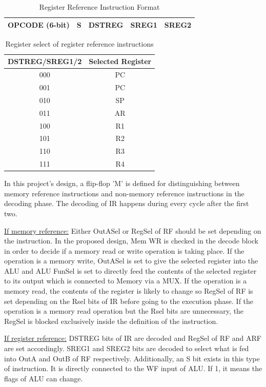 \documentclass[pdftex,12pt,a4paper]{article}
\begin{document}
\begin{table}[H]
\centering
\begin{tabular}{|c|c|c|c|c|}
  \hline
  OPCODE (6-bit) & S & DSTREG & SREG1 & SREG2\\
  \hline
\end{tabular}
\caption{Register Reference Instruction Format\cite{ref1}}
\end{table}

\begin{table}[H]
\centering
\begin{tabular}{|c|c|}
  \hline
  DSTREG/SREG1/2 & Selected Register\\
  \hline
  000 & PC\\
  \hline
  001 & PC\\
  \hline
  010 & SP\\
  \hline
  011 & AR\\
  \hline
  100 & R1\\
  \hline
  101 & R2\\
  \hline
  110 & R3\\
  \hline
  111 & R4\\
  \hline
\end{tabular}
\caption{Register select of register reference instructions\cite{ref1}}
\end{table}

In this project's design, a flip-flop 'M' is defined for distinguishing
between memory reference instructions and non-memory reference
instructions in the decoding phase. The decoding of IR happens during
every cycle after the first two.

\underline{If memory reference:}
Either OutASel or RegSel of RF should be set depending on the
instruction. In the proposed design, Mem WR is checked in the decode
block in order to decide if a memory read or write operation is
taking place. If the operation is a memory write, OutASel is set to
give the selected register into the ALU and ALU FunSel is set to
directly feed the contents of the selected register to its output
which is connected to Memory via a MUX. If the operation is a memory
read, the contents of the register is likely to change so RegSel of RF
is set depending on the Rsel bits of IR before going to the execution
phase. If the operation is a memory read operation but the Rsel bits
are unnecessary, the RegSel is blocked exclusively inside the
definition of the instruction.

\underline{If register reference:}
DSTREG bits of IR are decoded and RegSel of RF and ARF are set
accordingly. SREG1 and SREG2 bits are decoded to select what is fed 
into OutA and OutB of RF respectively. Additionally, an S bit exists
in this type of instruction. It is directly connected to the WF input
of ALU. If 1, it means the flags of ALU can change.
\end{document}
